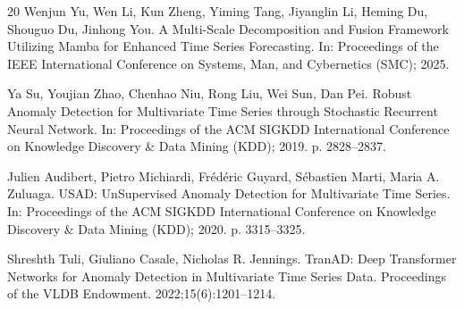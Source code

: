 \documentclass[runningheads]{llncs}
\begin{document}
\begin{thebibliography}{20}
Wenjun Yu, Wen Li, Kun Zheng, Yiming Tang, Jiyanglin Li, Heming Du, Shouguo Du, Jinhong You. A Multi-Scale Decomposition and Fusion Framework Utilizing Mamba for Enhanced Time Series Forecasting. In: Proceedings of the IEEE International Conference on Systems, Man, and Cybernetics (SMC); 2025. 

Ya Su, Youjian Zhao, Chenhao Niu, Rong Liu, Wei Sun, Dan Pei. Robust Anomaly Detection for Multivariate Time Series through Stochastic Recurrent Neural Network. In: Proceedings of the ACM SIGKDD International Conference on Knowledge Discovery \& Data Mining (KDD); 2019. p. 2828--2837. 

Julien Audibert, Pietro Michiardi, Fr\'ed\'eric Guyard, S\'ebastien Marti, Maria A. Zuluaga. USAD: UnSupervised Anomaly Detection for Multivariate Time Series. In: Proceedings of the ACM SIGKDD International Conference on Knowledge Discovery \& Data Mining (KDD); 2020. p. 3315--3325. 

Shreshth Tuli, Giuliano Casale, Nicholas R. Jennings. TranAD: Deep Transformer Networks for Anomaly Detection in Multivariate Time Series Data. Proceedings of the VLDB Endowment. 2022;15(6):1201--1214. 

\end{thebibliography}
\end{document}
